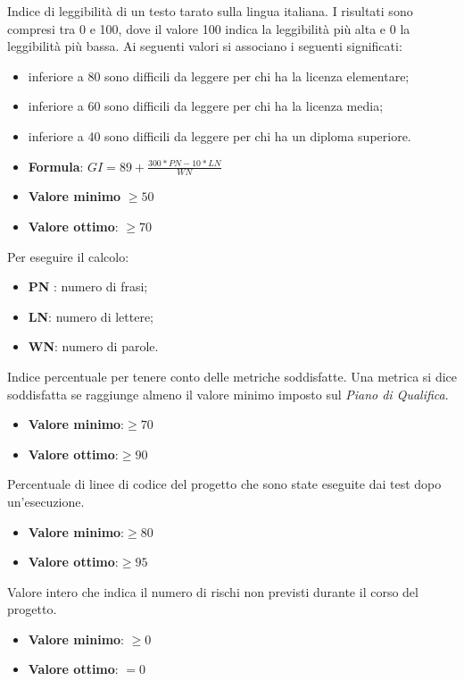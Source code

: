 Indice di leggibilità di un testo tarato sulla lingua italiana. I risultati sono compresi tra 0 e
100, dove il valore 100 indica la leggibilità più alta e 0 la leggibilità più bassa. Ai seguenti valori si
associano i seguenti significati:
\begin{itemize}
    \item inferiore a 80 sono difficili da leggere per chi ha la licenza elementare;
    \item inferiore a 60 sono difficili da leggere per chi ha la licenza media;
    \item inferiore a 40 sono difficili da leggere per chi ha un diploma superiore.
\end{itemize}
\begin{itemize}
    \item \textbf{Formula}: $GI=89+\frac{300*PN-10*LN}{WN}$
    \item \textbf{Valore minimo} $\geq50$
    \item \textbf{Valore ottimo}: $\geq70$
\end{itemize}  
Per eseguire il calcolo:
\begin{itemize}
    \item \textbf{PN} : numero di frasi;
    \item \textbf{LN}: numero di lettere;
    \item \textbf{WN}: numero di parole.
\end{itemize}

Indice percentuale per tenere conto delle metriche soddisfatte. Una
metrica si dice soddisfatta se raggiunge almeno il valore minimo imposto sul \textit{Piano di Qualifica}.
\begin{itemize}
    \item \textbf{Valore minimo}:$\geq70$
    \item \textbf{Valore ottimo}:$\geq90$
\end{itemize}  

Percentuale di linee di codice del progetto che sono state eseguite dai test dopo
un’esecuzione.
\begin{itemize}
    \item \textbf{Valore minimo}:$\geq80$
    \item \textbf{Valore ottimo}:$\geq95$
\end{itemize}  


Valore intero che indica il numero di rischi non previsti durante il corso del progetto.
\begin{itemize}
    \item \textbf{Valore minimo}: $\geq0$
    \item \textbf{Valore ottimo}: $=0$
\end{itemize}  


